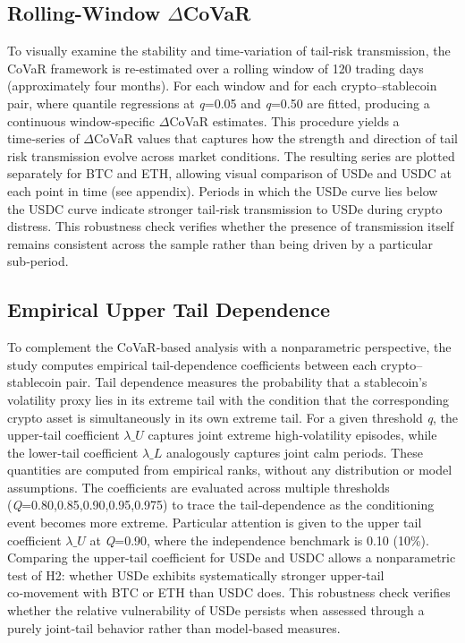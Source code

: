 \documentclass[12pt,a4paper,titlepage,oneside,english]{article}
\begin{document}
\subsection{Rolling-Window $\Delta$CoVaR}
To visually examine the stability and time‑variation of tail‑risk transmission, the CoVaR framework is re‑estimated over a rolling window of 120 trading days (approximately four months). For each window and for each crypto–stablecoin pair, where quantile regressions at \textit{q}=0.05 and \textit{q}=0.50 are fitted, producing a continuous window‑specific $\Delta$CoVaR estimates. This procedure yields a time‑series of $\Delta$CoVaR values that captures how the strength and direction of tail risk transmission evolve across market conditions. The resulting series are plotted separately for BTC and ETH, allowing visual comparison of USDe and USDC at each point in time (see appendix). Periods in which the USDe curve lies below the USDC curve indicate stronger tail‑risk transmission to USDe during crypto distress. This robustness check verifies whether the presence of transmission itself remains consistent across the sample rather than being driven by a particular sub‑period.

\subsection{Empirical Upper Tail Dependence}
To complement the CoVaR‑based analysis with a nonparametric perspective, the study computes empirical tail‑dependence coefficients between each crypto–stablecoin pair. Tail dependence measures the probability that a stablecoin’s volatility proxy lies in its extreme tail with the condition that the corresponding crypto asset is simultaneously in its own extreme tail. For a given threshold \textit{q}, the upper-tail coefficient $\lambda\_U$ captures joint extreme high‑volatility episodes, while the lower‑tail coefficient $\lambda\_L$ analogously captures joint calm periods. These quantities are computed from empirical ranks, without any distribution or model assumptions. The coefficients are evaluated across multiple thresholds (\textit{Q}=0.80,0.85,0.90,0.95,0.975) to trace the tail‑dependence as the conditioning event becomes more extreme. Particular attention is given to the upper tail coefficient $\lambda\_U$ at \textit{Q}=0.90, where the independence benchmark is 0.10 (10\%). Comparing the upper-tail coefficient for USDe and USDC allows a nonparametric test of H2: whether USDe exhibits systematically stronger upper‑tail co‑movement with BTC or ETH than USDC does. This robustness check verifies whether the relative vulnerability of USDe persists when assessed through a purely joint‑tail behavior rather than model‑based measures.
\end{document}
